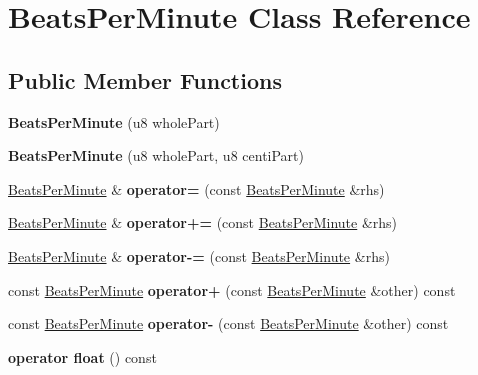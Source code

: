 \hypertarget{class_beats_per_minute}{}\section{Beats\+Per\+Minute Class Reference}
\label{class_beats_per_minute}
\subsection*{Public Member Functions}
\begin{DoxyCompactItemize}
\item 
\mbox{\label{class_beats_per_minute_a006f57b1e097f90a44ba0ea434c2be28}} 
{\bfseries Beats\+Per\+Minute} (u8 whole\+Part)
\item 
\mbox{\label{class_beats_per_minute_a1b0b7e3fcce423c26b216cfcb76dc912}} 
{\bfseries Beats\+Per\+Minute} (u8 whole\+Part, u8 centi\+Part)
\item 
\mbox{\label{class_beats_per_minute_a68ce30cb56bc0fde3023d2cad34ccbbd}} 
\mbox{\hyperlink{class_beats_per_minute}{Beats\+Per\+Minute}} \& {\bfseries operator=} (const \mbox{\hyperlink{class_beats_per_minute}{Beats\+Per\+Minute}} \&rhs)
\item 
\mbox{\label{class_beats_per_minute_ac656e785ca30cc331b66baddd609af66}} 
\mbox{\hyperlink{class_beats_per_minute}{Beats\+Per\+Minute}} \& {\bfseries operator+=} (const \mbox{\hyperlink{class_beats_per_minute}{Beats\+Per\+Minute}} \&rhs)
\item 
\mbox{\label{class_beats_per_minute_a51ad0bb7091a26465631173b85ba7710}} 
\mbox{\hyperlink{class_beats_per_minute}{Beats\+Per\+Minute}} \& {\bfseries operator-\/=} (const \mbox{\hyperlink{class_beats_per_minute}{Beats\+Per\+Minute}} \&rhs)
\item 
\mbox{\label{class_beats_per_minute_aac9ef75cb92e0f1e6799a33e381893f6}} 
const \mbox{\hyperlink{class_beats_per_minute}{Beats\+Per\+Minute}} {\bfseries operator+} (const \mbox{\hyperlink{class_beats_per_minute}{Beats\+Per\+Minute}} \&other) const
\item 
\mbox{\label{class_beats_per_minute_ac8e58056288d040be7d71c6a4bcc352b}} 
const \mbox{\hyperlink{class_beats_per_minute}{Beats\+Per\+Minute}} {\bfseries operator-\/} (const \mbox{\hyperlink{class_beats_per_minute}{Beats\+Per\+Minute}} \&other) const
\item 
\mbox{\label{class_beats_per_minute_a57140a41e739066712c6761b43fc4489}} 
{\bfseries operator float} () const
\end{DoxyCompactItemize}


